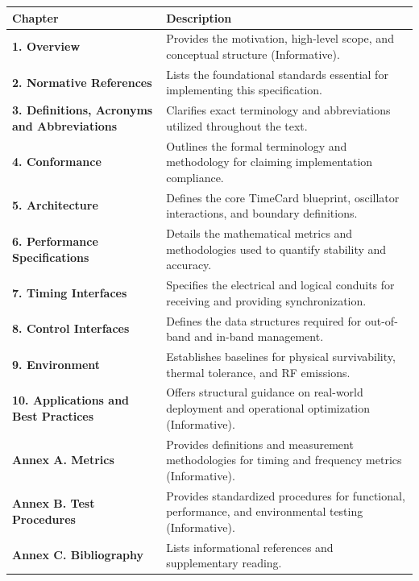 {\def\LTcaptype{none} %
\begin{longtable}[]{@{}
  >{\raggedright\arraybackslash}p{}
  >{\raggedright\arraybackslash}p{}@{}}
\toprule\noalign{}
\begin{minipage}[b]{\linewidth}\raggedright
Chapter
\end{minipage} & \begin{minipage}[b]{\linewidth}\raggedright
Description
\end{minipage} \\
\midrule\noalign{}
\endhead
\bottomrule\noalign{}
\endlastfoot
\textbf{1. Overview} & Provides the motivation, high-level scope, and
conceptual structure (Informative). \\
\textbf{2. Normative References} & Lists the foundational standards
essential for implementing this specification. \\
\textbf{3. Definitions, Acronyms and Abbreviations} & Clarifies exact
terminology and abbreviations utilized throughout the text. \\
\textbf{4. Conformance} & Outlines the formal terminology and
methodology for claiming implementation compliance. \\
\textbf{5. Architecture} & Defines the core TimeCard blueprint,
oscillator interactions, and boundary definitions. \\
\textbf{6. Performance Specifications} & Details the mathematical
metrics and methodologies used to quantify stability and accuracy. \\
\textbf{7. Timing Interfaces} & Specifies the electrical and logical
conduits for receiving and providing synchronization. \\
\textbf{8. Control Interfaces} & Defines the data structures required
for out-of-band and in-band management. \\
\textbf{9. Environment} & Establishes baselines for physical
survivability, thermal tolerance, and RF emissions. \\
\textbf{10. Applications and Best Practices} & Offers structural
guidance on real-world deployment and operational optimization
(Informative). \\
\textbf{Annex A. Metrics} & Provides definitions and measurement
methodologies for timing and frequency metrics (Informative). \\
\textbf{Annex B. Test Procedures} & Provides standardized procedures for
functional, performance, and environmental testing (Informative). \\
\textbf{Annex C. Bibliography} & Lists informational references and
supplementary reading. \\
\end{longtable}
}


